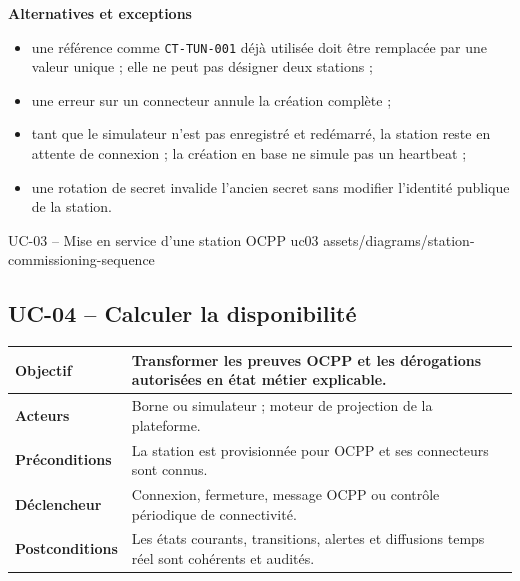 \textbf{Alternatives et exceptions}
\begin{itemize}[leftmargin=7mm]
  \item une référence comme \texttt{CT-TUN-001} déjà utilisée doit être remplacée par
  une valeur unique ; elle ne peut pas désigner deux stations ;
  \item une erreur sur un connecteur annule la création complète ;
  \item tant que le simulateur n'est pas enregistré et redémarré, la station reste en
  attente de connexion ; la création en base ne simule pas un heartbeat ;
  \item une rotation de secret invalide l'ancien secret sans modifier l'identité
  publique de la station.
\end{itemize}

\UseCaseUmlPlate
  {UC-03 -- Mise en service d'une station OCPP}
  {uc03}
  {assets/diagrams/station-commissioning-sequence}

\subsection{UC-04 -- Calculer la disponibilité}

\begin{table}[H]
  \centering
  \begin{tabularx}{\textwidth}{|C{3.3cm}|Y|}
    \hline
    \textbf{Objectif} & Transformer les preuves OCPP et les dérogations autorisées en
    état métier explicable.\\\hline
    \textbf{Acteurs} & Borne ou simulateur ; moteur de projection de la plateforme.\\\hline
    \textbf{Préconditions} & La station est provisionnée pour OCPP et ses connecteurs
    sont connus.\\\hline
    \textbf{Déclencheur} & Connexion, fermeture, message OCPP ou contrôle périodique
    de connectivité.\\\hline
    \textbf{Postconditions} & Les états courants, transitions, alertes et diffusions
    temps réel sont cohérents et audités.\\\hline

  \end{tabularx}
\end{table}


